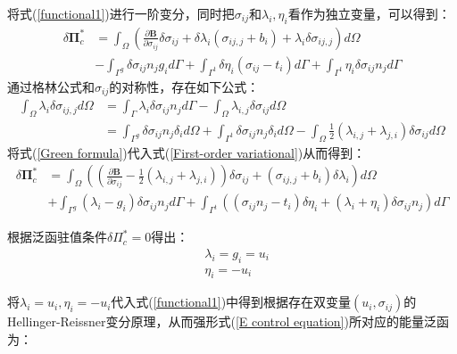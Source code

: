 将式(\ref{functional1})进行一阶变分，同时把$\sigma_{ij}$和$\lambda_i,\eta_i$看作为独立变量，可以得到：
\begin{equation}\label{First-order variational}
\begin{split}
    \delta\pmb{\Pi}_c^*&=\int_{\Omega}(\frac{\partial\pmb{B}}{\partial\sigma_{ij}}\delta\sigma_{ij}+\delta\lambda_i(\sigma_{ij,j}+b_i)+\lambda_i\delta\sigma_{ij,j})d\Omega\\
&-\int_{\Gamma^g}\delta\sigma_{ij}n_jg_id\Gamma+\int_{\Gamma^t}\delta\eta_i(\sigma_{ij}-t_i)d\Gamma+\int_{\Gamma^t}\eta_i\delta\sigma_{ij}n_jd\Gamma
\end{split}
\end{equation}
通过格林公式和$\sigma_{ij}$的对称性，存在如下公式：
\begin{equation}\label{Green formula}
\begin{split}
    \int_{\Omega}\lambda_i\delta\sigma_{ij,j}d\Omega&=\int_{\Gamma}\lambda_i\delta\sigma_{ij}n_jd\Gamma-\int_{\Omega}\lambda_{i,j}\delta\sigma_{ij}d\Omega\\
&=\int_{\Gamma^g}\delta\sigma_{ij}n_j\delta_id\Omega+\int_{\Gamma^t}\delta\sigma_{ij}n_j\delta_id\Omega-\int_{\Omega}\frac{1}{2}(\lambda_{i,j}+\lambda_{j,i})\delta\sigma_{ij}d\Omega
\end{split}
\end{equation}
将式(\ref{Green formula})代入式(\ref{First-order variational})从而得到：
\begin{equation}
\begin{split}
    \delta\pmb{\Pi}_c^*&=\int_{\Omega}((\frac{\partial\pmb{B}}{\partial\sigma_{ij}}-\frac{1}{2}(\lambda_{i,j}+\lambda_{j,i}))\delta\sigma_{ij}+(\sigma_{ij,j}+b_i)\delta\lambda_i)d\Omega\\
    &+\int_{\Gamma^g}(\lambda_i-g_i)\delta\sigma_{ij}n_jd\Gamma+\int_{\Gamma^t}((\sigma_{ij}n_j-t_i)\delta\eta_i+(\lambda_i+\eta_i)\delta\sigma_{ij}n_j)d\Gamma
\end{split}
\end{equation}\par
根据泛函驻值条件$\delta\Pi_c^*=0$得出：
\begin{equation}
\begin{split}
    &\lambda_i=g_i=u_i\\
    &\eta_i=-u_i
\end{split}
\end{equation}\par
将$\lambda_i=u_i,\eta_i=-u_i$代入式(\ref{functional1})中得到根据存在双变量$(u_i,\sigma_{ij})$的Hellinger-Reissner变分原理，从而强形式(\ref{E control equation})所对应的能量泛函为：
